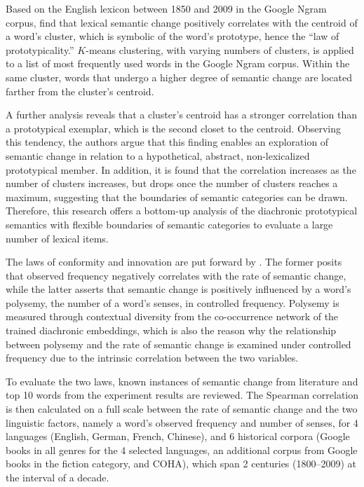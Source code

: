 Based on the English lexicon between 1850 and 2009 in the Google Ngram corpus, \textcite{dubossarsky2015bottom} find that lexical semantic change positively correlates with the centroid of a word's cluster, which is symbolic of the word's prototype, hence the ``law of prototypicality.'' $K$-means clustering, with varying numbers of clusters, is applied to a list of most frequently used words in the Google Ngram corpus. Within the same cluster, words that undergo a higher degree of semantic change are located farther from the cluster's centroid.

A further analysis reveals that a cluster's centroid has a stronger correlation than a prototypical exemplar, which is the second closet to the centroid. Observing this tendency, the authors argue that this finding enables an exploration of semantic change in relation to a hypothetical, abstract, non-lexicalized prototypical member. In addition, it is found that the correlation increases as the number of clusters increases, but drops once the number of clusters reaches a maximum, suggesting that the boundaries of semantic categories can be drawn. Therefore, this research offers a bottom-up analysis of the diachronic prototypical semantics with flexible boundaries of semantic categories to evaluate a large number of lexical items.

The laws of conformity and innovation are put forward by \textcite{hamilton2016law}. The former posits that observed frequency negatively correlates with the rate of semantic change, while the latter asserts that semantic change is positively influenced by a word's polysemy, the number of a word's senses, in controlled frequency. Polysemy is measured through contextual diversity from the co-occurrence network of the trained diachronic embeddings, which is also the reason why the relationship between polysemy and the rate of semantic change is examined under controlled frequency due to the intrinsic correlation between the two variables.

To evaluate the two laws, known instances of semantic change from literature and top 10 words from the experiment results are reviewed. The Spearman correlation is then calculated on a full scale between the rate of semantic change and the two linguistic factors, namely a word's observed frequency and number of senses, for 4 languages (English, German, French, Chinese), and 6 historical corpora (Google books in all genres for the 4 selected languages, an additional corpus from Google books in the fiction category, and COHA), which span 2 centuries (1800--2009) at the interval of a decade. 


